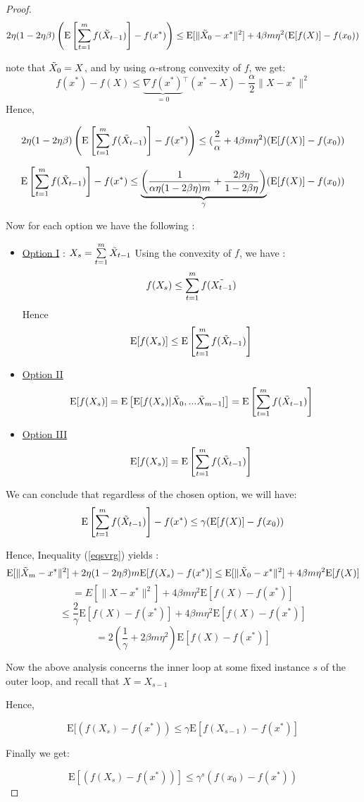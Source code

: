 \documentclass[12pt]{report}
\newcommand{\E}{\mathrm{E}}
\begin{document}
\begin{proof}
\begin{equation}\label{eqsvrg}
2\eta(1-2\eta\beta)\left(\E\left[\sum\limits_{t=1}^mf(\Tilde{X}_{t-1})\right]-f(x^*)\right) \leq \E[\|\Tilde{X}_0-x^* \|^2]+4\beta m \eta^2(\E[f(X)]-f(x_0))
\end{equation}

note that $\Tilde{X}_0=X$, and by using $\alpha$-strong convexity of $f$, we get:
$$f(x^*)-f(X)\leq \underbrace{\nabla f(x^*)}_{=0}{}^ \top(x^*-X)-\frac{\alpha}{2}\|X-x^*\|^2 $$
Hence,

\begin{equation}
    2\eta(1-2\eta\beta)\left(\E\left[\sum\limits_{t=1}^mf(\Tilde{X}_{t-1})\right]-f(x^*)\right) \leq (\frac{2}{\alpha}+4\beta m \eta^2)(\E[f(X)]-f(x_0))
\end{equation}



\begin{equation}
   \E\left[\sum\limits_{t=1}^mf(\Tilde{X}_{t-1})\right]-f(x^*) \leq \underbrace{\left(\frac{1}{\alpha\eta(1-2\beta\eta)m}+\frac{2\beta\eta}{1-2\beta\eta}\right)}_{\gamma}(\E[f(X)]-f(x_0))
\end{equation}


Now for each option we have the following :
\begin{itemize}
    \item  \underline{Option I} : $X_s=\sum\limits_{t=1}^m \Tilde{X}_{t-1}$
    Using the convexity of $f$, we have :
    $$f(X_s)\leq \sum\limits_{t=1}^m f(\Tilde{X_{t-1}})$$
    Hence 
    $$\E[f(X_s)]\leq \E\left[\sum\limits_{t=1}^m f(\Tilde{X}_{t-1})\right]$$
    
    \item \underline{Option II}
    $$\E[f(X_s)]=\E\left[\E[f(X_s)|\Tilde{X}_0,...\Tilde{X}_{m-1}]\right]=\E\left[\sum\limits_{t=1}^mf(\Tilde{X}_{t-1})\right]    $$
    \item \underline{Option III}
    $$\E[f(X_s)]=\E\left[\sum\limits_{t=1}^mf(\Tilde{X}_{t-1})\right]    $$

\end{itemize}

We can conclude that regardless of the chosen option, we will  have:
$$   \E\left[\sum\limits_{t=1}^mf(\Tilde{X}_{t-1})\right]-f(x^*) \leq \gamma(\E[f(X)]-f(x_0))  $$


Hence, Inequality (\ref{eqsvrg}) yields : 
$$\E[\|\Tilde{X}_m-x^* \|^2]+2\eta(1-2\eta\beta)m\E[f(X_s)-f(x^*)] \leq \E[\|\Tilde{X}_0-x^* \|^2]+4\beta m \eta^2\E[f(X) ]$$
$$=E[\|X-x^*\|^2]+4\beta m\eta^2 \E[f(X)-f(x^*)]$$
$$\leq \frac{2}{\gamma} \E[f(X)-f(x^*)]+4\beta m \eta^2\E[f(X)-f(x^*)]$$
$$=2\left(\frac{1}{\gamma}+2\beta m \eta^2\right)\E[f(X)-f(x^*)]$$

Now the above analysis concerns the inner loop at some fixed instance $s$ of the outer loop, and recall that $X=X_{s-1}$

Hence,

$$\E[\left(f({X}_s)-f(x^*)\right) \leq \gamma\E[f({X}_{s-1})-f(x^*)]$$

Finally we get:

$$\E[\left(f({X}_s)-f(x^*)\right)]
\leq \gamma^s \left(f({x}_{0})-f(x^*)\right)$$
\end{proof}
\end{document}
